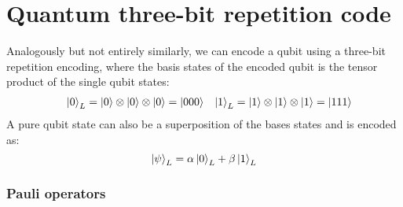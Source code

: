 \section{Quantum three-bit repetition code}

Analogously but not entirely similarly, we can encode a qubit using a three-bit repetition encoding, where the basis states of the encoded qubit is the tensor product of the single qubit states:
\begin{align}\label{eq:qb_3bitlogicalq}
&& \ket{0}_L = \ket{0}\otimes\ket{0}\otimes\ket{0} = \ket{000} && \ket{1}_L = \ket{1}\otimes\ket{1}\otimes\ket{1} = \ket{111}
\end{align}
A pure qubit state can also be a superposition of the bases states and is encoded as:
\begin{equation}\label{eq:qec_3bitstate}
  \ket{\psi}_L = \alpha\ket{0}_L + \beta\ket{1}_L
\end{equation}

\subsubsection{Pauli operators}

